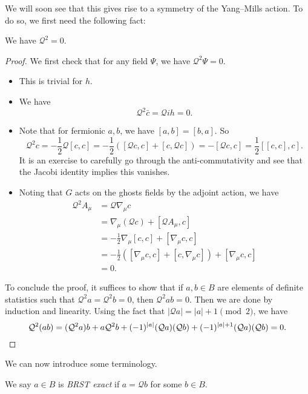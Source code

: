 \documentclass[a4paper]{article}
\begin{document}
We will soon see that this gives rise to a symmetry of the Yang--Mills action. To do so, we first need the following fact:
\begin{thm}
  We have $\mathcal{Q}^2 = 0$.
\end{thm}

\begin{proof}
  We first check that for any field $\Psi$, we have $\mathcal{Q}^2 \Psi = 0$.
  \begin{itemize}
    \item This is trivial for $h$.
    \item We have
      \[
        \mathcal{Q}^2 \bar{c} = \mathcal{Q}i h = 0.
      \]
    \item Note that for fermionic $a, b$, we have $[a, b] = [b, a]$. So
      \[
        \mathcal{Q}^2 c = -\frac{1}{2} \mathcal{Q} [c, c] = -\frac{1}{2} ([\mathcal{Q} c, c] + [c, \mathcal{Q} c]) = -[\mathcal{Q}c, c] = \frac{1}{2} [[c, c], c].
      \]
      It is an exercise to carefully go through the anti-commutativity and see that the Jacobi identity implies this vanishes.
    \item Noting that $G$ acts on the ghosts fields by the adjoint action, we have
      \begin{align*}
        \mathcal{Q}^2 A_\mu &= \mathcal{Q} \nabla_\mu c \\
        &= \nabla_\mu (\mathcal{Q} c) + [\mathcal{Q} A_\mu, c]\\
        &= - \frac{1}{2} \nabla_\mu [c, c] + [\nabla_\mu c, c]\\
        &= - \frac{1}{2} ([\nabla_\mu c, c] + [c, \nabla_\mu c]) + [\nabla_\mu c, c]\\
        &= 0.
      \end{align*}
  \end{itemize}
  To conclude the proof, it suffices to show that if $a, b \in B$ are elements of definite statistics such that $\mathcal{Q}^2 a = \mathcal{Q}^2 b = 0$, then $\mathcal{Q}^2 ab = 0$. Then we are done by induction and linearity. Using the fact that $|\mathcal{Q} a| = |a| + 1 \pmod 2$, we have
  \[
    \mathcal{Q}^2 (ab) = (\mathcal{Q}^2 a) b + a \mathcal{Q}^2 b + (-1)^{|a|} (\mathcal{Q} a) (\mathcal{Q} b) + (-1)^{|a| + 1} (\mathcal{Q} a) (\mathcal{Q} b) = 0.\qedhere
  \]
\end{proof}

We can now introduce some terminology.
\begin{defi}
  We say $a \in B$ is \emph{BRST exact} if $a = \mathcal{Q} b$ for some $b \in B$.
\end{defi}
\end{document}

